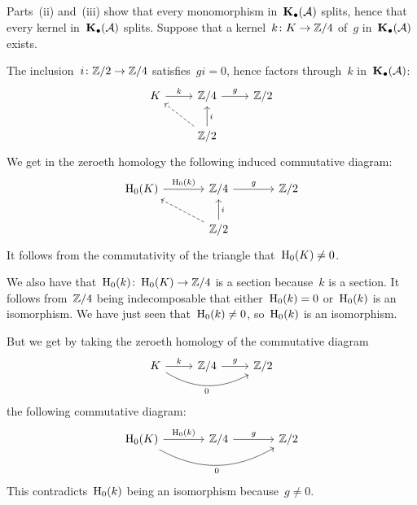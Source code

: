 \subsection{}

Parts~(ii) and~(iii) show that every monomorphism in~$\mathbf{K}_\bullet(\mathcal{A})$ splits, hence that every kernel in~$\mathbf{K}_\bullet(\mathcal{A})$ splits.
Suppose that a kernel~$k \colon K \to \mathbb{Z}/4$ of~$g$ in~$\mathbf{K}_\bullet(\mathcal{A})$ exists.

The inclusion~$i \colon \mathbb{Z}/2 \to \mathbb{Z}/4$ satisfies~$gi = 0$, hence factors through~$k$ in~$\mathbf{K}_\bullet(\mathcal{A})$:
\[
  \begin{tikzcd}
      K
      \arrow{r}[above]{k}
    & \Integer/4
      \arrow{r}[above]{g}
    & \Integer/2
    \\
      {}
    & \Integer/2
      \arrow[dashed]{ul}
      \arrow{u}[right]{i}
    & {}
  \end{tikzcd}
\]
We get in the zeroeth homology the following induced commutative diagram:
\[
  \begin{tikzcd}[column sep = large]
      \Hl_0(K)
      \arrow{r}[above]{\Hl_0(k)}
    & \Integer/4
      \arrow{r}[above]{g}
    & \Integer/2
    \\
      {}
    & \Integer/2
      \arrow[dashed]{ul}
      \arrow{u}[right]{i}
    & {}
  \end{tikzcd}
\]
It follows from the commutativity of the triangle that~$\operatorname{H}_0(K) \neq 0$.

We also have that~$\operatorname{H}_0(k) \colon \operatorname{H}_0(K) \to \mathbb{Z}/4$ is a section because~$k$ is a section.
It follows from~$\mathbb{Z}/4$ being indecomposable that either~$\operatorname{H}_0(k) = 0$ or~$\operatorname{H}_0(k)$ is an isomorphism.
We have just seen that~$\operatorname{H}_0(k) \neq 0$, so~$\operatorname{H}_0(k)$ is an isomorphism.

But we get by taking the zeroeth homology of the commutative diagram
\[
  \begin{tikzcd}
      K
      \arrow{r}[above]{k}
      \arrow[bend right]{rr}[below]{0}
    & \Integer/4
      \arrow{r}[above]{g}
    & \Integer/2
  \end{tikzcd}
\]
the following commutative diagram:
\[
  \begin{tikzcd}[column sep = large]
      \Hl_0(K)
      \arrow{r}[above]{\Hl_0(k)}
      \arrow[bend right]{rr}[below]{0}
    & \Integer/4
      \arrow{r}[above]{g}
    & \Integer/2
  \end{tikzcd}
\]
This contradicts~$\operatorname{H}_0(k)$ being an isomorphism because~$g \neq 0$.










